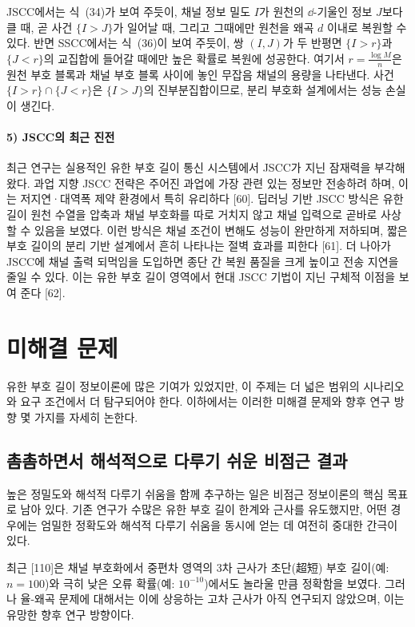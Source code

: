 JSCC에서는 식~(34)가 보여 주듯이, 채널 정보 밀도 $I$가 원천의 $\dd$-기울인 정보 $J$보다 클 때, 곧 사건 $\{I>J\}$가 일어날 때, 그리고 그때에만 원천을 왜곡 $d$ 이내로 복원할 수 있다. 반면 SSCC에서는 식~(36)이 보여 주듯이, 쌍 $(I,J)$가 두 반평면 $\{I>r\}$과 $\{J<r\}$의 교집합에 들어갈 때에만 높은 확률로 복원에 성공한다. 여기서 $r=\frac{\log M}{n}$은 원천 부호 블록과 채널 부호 블록 사이에 놓인 무잡음 채널의 용량을 나타낸다. 사건 $\{I>r\}\cap\{J<r\}$은 $\{I>J\}$의 진부분집합이므로, 분리 부호화 설계에서는 성능 손실이 생긴다.

\paragraph{5) JSCC의 최근 진전}
최근 연구는 실용적인 유한 부호 길이 통신 시스템에서 JSCC가 지닌 잠재력을 부각해 왔다. 과업 지향 JSCC 전략은 주어진 과업에 가장 관련 있는 정보만 전송하려 하며, 이는 저지연·대역폭 제약 환경에서 특히 유리하다 [60]. 딥러닝 기반 JSCC 방식은 유한 길이 원천 수열을 압축과 채널 부호화를 따로 거치지 않고 채널 입력으로 곧바로 사상할 수 있음을 보였다. 이런 방식은 채널 조건이 변해도 성능이 완만하게 저하되며, 짧은 부호 길이의 분리 기반 설계에서 흔히 나타나는 절벽 효과를 피한다 [61]. 더 나아가 JSCC에 채널 출력 되먹임을 도입하면 종단 간 복원 품질을 크게 높이고 전송 지연을 줄일 수 있다. 이는 유한 부호 길이 영역에서 현대 JSCC 기법이 지닌 구체적 이점을 보여 준다 [62].

\section{미해결 문제}

유한 부호 길이 정보이론에 많은 기여가 있었지만, 이 주제는 더 넓은 범위의 시나리오와 요구 조건에서 더 탐구되어야 한다. 이하에서는 이러한 미해결 문제와 향후 연구 방향 몇 가지를 자세히 논한다.

\subsection{촘촘하면서 해석적으로 다루기 쉬운 비점근 결과}

높은 정밀도와 해석적 다루기 쉬움을 함께 추구하는 일은 비점근 정보이론의 핵심 목표로 남아 있다. 기존 연구가 수많은 유한 부호 길이 한계와 근사를 유도했지만, 어떤 경우에는 엄밀한 정확도와 해석적 다루기 쉬움을 동시에 얻는 데 여전히 중대한 간극이 있다.

최근 [110]은 채널 부호화에서 중편차 영역의 3차 근사가 초단(超短) 부호 길이(예: $n=100$)와 극히 낮은 오류 확률(예: $10^{-10}$)에서도 놀라울 만큼 정확함을 보였다. 그러나 율-왜곡 문제에 대해서는 이에 상응하는 고차 근사가 아직 연구되지 않았으며, 이는 유망한 향후 연구 방향이다.

